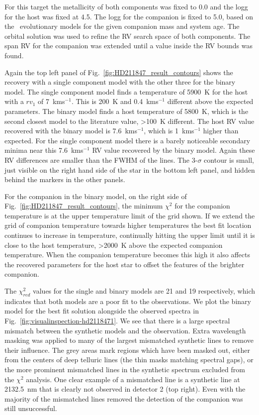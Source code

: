 \documentclass[fleqn,usenatbib]{mnras}
\begin{document}
For this target the metallicity of both components was fixed to 0.0 and the logg for the host was fixed at 4.5. The logg for the companion is fixed to 5.0, based on the~\citet{baraffe_new_2015} evolutionary models for the given companion mass and system age. The orbital solution was used to refine the RV search space of both components. The span RV for the companion was extended until a value inside the RV bounds was found.

Again the top left panel of Fig.~\ref{fig:HD211847_result_contours} shows the recovery with a single component model with the other three for the binary model. The single component model finds a temperature of 5900~K for the host with a \({rv}_1\) of 7~kms\(^{-1}\). This is 200~K and 0.4~kms\(^{-1}\) different above the expected parameters. The binary model finds a host temperature of 5800~K, which is the second closest model to the literature value, >100~K different. The host RV value recovered with the binary model is 7.6~kms\(^{-1}\), which is 1~kms\(^{-1}\) higher than expected.  For the single component model there is a barely noticeable secondary minima near this 7.6~kms\(^{-1}\) RV value recovered by the binary model. Again these RV differences are smaller than the FWHM of the lines. The 3-\(\sigma\) contour is small, just visible on the right hand side of the star in the bottom left panel, and hidden behind the markers in the other panels. 


For the companion in the binary model, on the right side of Fig.~\ref{fig:HD211847_result_contours}, the minimum \(\chi^2\) for the companion temperature is at the upper temperature limit of the grid shown. If we extend the grid of companion temperature towards higher temperatures the best fit location continues to increase in temperature, continually hitting the upper limit until it is close to the host temperature, >2000~K above the expected companion temperature. When the companion temperature becomes this high it also affects the recovered parameters for the host star to offset the features of the brighter companion. 

The \(\chi^2_{red}\) values for the single and binary models are 21 and 19 respectively, which indicates that both models are a poor fit to the observations. We plot the binary model for the best fit solution alongside the observed spectra in Fig.~\ref{fig:visualinspection-hd2118471}. We see that there is a large spectral mismatch between the synthetic models and the observation. Extra wavelength masking was applied to many of the largest mismatched synthetic lines to remove their influence. The grey areas mark regions which have been masked out, either from the centers of deep telluric lines (the thin masks matching spectral gaps), or the more prominent mismatched lines in the synthetic spectrum excluded from the \(\chi^2\) analysis. One clear example of a mismatched line is a synthetic line at 2132.5~nm that is clearly not observed in detector 2 (top right). Even with the majority of the mismatched lines removed the detection of the companion was still unsuccessful.
\end{document}
